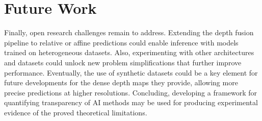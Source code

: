 \section{Future Work}
Finally, open research challenges remain to address.
Extending the depth fusion pipeline to relative or affine predictions could enable inference with models trained on heterogeneous datasets. 
Also, experimenting with other architectures and datasets could unlock new problem simplifications that further improve performance.
Eventually, the use of synthetic datasets could be a key element for future developments for the dense depth maps they provide, allowing more precise predictions at higher resolutions.
Concluding, developing a framework for quantifying transparency of AI methods may be used for producing experimental evidence of the proved theoretical limitations.
%
